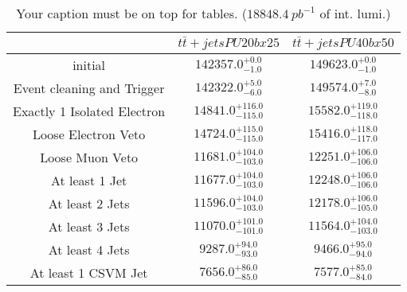 \documentclass{article}
\begin{document}
\begin{table}
\caption{Your caption must be on top for tables. ($18848.4~pb^{-1}$ of int. lumi.)}
\label{tab:}
\centering
\begin{tabular}{|c|cc|}
\toprule
&$t\bar{t}+jets PU20bx25$	&$t\bar{t}+jets PU40bx50$	\\

\midrule
initial&	$142357.0^{+0.0}_{-1.0}$	&$149623.0^{+0.0}_{-1.0}$	\\

Event cleaning and Trigger&	$142322.0^{+5.0}_{-6.0}$	&$149574.0^{+7.0}_{-8.0}$	\\

Exactly 1 Isolated Electron&	$14841.0^{+116.0}_{-115.0}$	&$15582.0^{+119.0}_{-118.0}$	\\

Loose Electron Veto&	$14724.0^{+115.0}_{-115.0}$	&$15416.0^{+118.0}_{-117.0}$	\\

Loose Muon Veto&	$11681.0^{+104.0}_{-103.0}$	&$12251.0^{+106.0}_{-106.0}$	\\

At least 1 Jet&	$11677.0^{+104.0}_{-103.0}$	&$12248.0^{+106.0}_{-106.0}$	\\

At least 2 Jets&	$11596.0^{+104.0}_{-103.0}$	&$12178.0^{+106.0}_{-105.0}$	\\

At least 3 Jets&	$11070.0^{+101.0}_{-101.0}$	&$11564.0^{+104.0}_{-103.0}$	\\

At least 4 Jets&	$9287.0^{+94.0}_{-93.0}$	&$9466.0^{+95.0}_{-94.0}$	\\

At least 1 CSVM Jet&	$7656.0^{+86.0}_{-85.0}$	&$7577.0^{+85.0}_{-84.0}$	\\

\bottomrule
\end{tabular}
\end{table}
\end{document}
